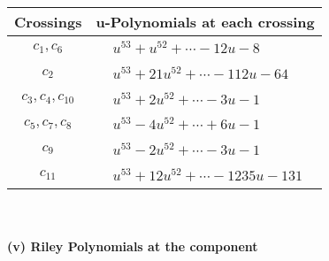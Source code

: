 \documentclass[1p]{elsarticle_modified}
\theoremstyle{definition}
\begin{document}
\begin{tabular}{m{50pt}|m{274pt}}
Crossings & \hspace{64pt}u-Polynomials at each crossing \\
\hline $$\begin{aligned}c_{1},c_{6}\end{aligned}$$&$\begin{aligned}
&u^{53}+u^{52}+\cdots-12 u-8
\end{aligned}$\\
\hline $$\begin{aligned}c_{2}\end{aligned}$$&$\begin{aligned}
&u^{53}+21 u^{52}+\cdots-112 u-64
\end{aligned}$\\
\hline $$\begin{aligned}c_{3},c_{4},c_{10}\end{aligned}$$&$\begin{aligned}
&u^{53}+2 u^{52}+\cdots-3 u-1
\end{aligned}$\\
\hline $$\begin{aligned}c_{5},c_{7},c_{8}\end{aligned}$$&$\begin{aligned}
&u^{53}-4 u^{52}+\cdots+6 u-1
\end{aligned}$\\
\hline $$\begin{aligned}c_{9}\end{aligned}$$&$\begin{aligned}
&u^{53}-2 u^{52}+\cdots-3 u-1
\end{aligned}$\\
\hline $$\begin{aligned}c_{11}\end{aligned}$$&$\begin{aligned}
&u^{53}+12 u^{52}+\cdots-1235 u-131
\end{aligned}$\\
\hline
\end{tabular}\\~\\
\newpage\renewcommand{\arraystretch}{1}
\flushleft \textbf{(v) Riley Polynomials at the component}\newline \\
\end{document}
